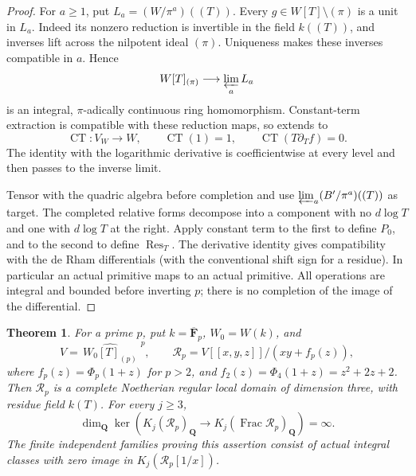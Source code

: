 \documentclass[11pt,a4paper]{amsart}
\numberwithin{equation}{section}
\newtheorem{theorem}{Theorem}[section]
\theoremstyle{definition}
\theoremstyle{remark}
\newcommand{\Q}{\mathbf Q}
\newcommand{\F}{\mathbf F}
\newcommand{\Frac}{\operatorname{Frac}}
\begin{document}
\begin{proof}
For $a\geq1$, put $L_a=(W/\pi^a)((T))$.
Every $g\in W[T]\setminus(\pi)$ is a unit in $L_a$.
Indeed its nonzero reduction is invertible in the field
$k((T))$, and inverses lift across the nilpotent ideal $(\pi)$.
Uniqueness makes these inverses compatible in $a$. Hence
\[
 W[T]_{(\pi)}\longrightarrow\varprojlim_a L_a
\]
is an integral, $\pi$-adically continuous ring homomorphism.
Constant-term extraction is compatible with these reduction maps,
so extends to
\[
 \operatorname{CT}:V_W\longrightarrow W,\qquad
 \operatorname{CT}(1)=1,\qquad
 \operatorname{CT}(T\partial_T f)=0.
\]
The identity with the logarithmic derivative is coefficientwise
at every level and then passes to the inverse limit.

Tensor with the quadric algebra before completion and use
$\varprojlim_a(B'/\pi^a)((T))$ as target.  The completed relative
forms decompose into a component with no $d\log T$ and one
with $d\log T$ at the right. Apply constant term to the first
to define $P_0$, and to the second to define
$\operatorname{Res}_T$.
The derivative identity gives compatibility with the de Rham
differentials (with the conventional shift sign for a residue).
In particular an actual primitive maps to an actual primitive.
All operations are integral and bounded before inverting $p$;
there is no completion of the image of the differential.
\end{proof}

\begin{theorem}
\label{d3:thm:completedfixedalldegree}
For a prime $p$, put $k=\overline{\F}_p$, $W_0=W(k)$, and
\[
 V=\widehat{\,W_0[T]_{(p)}\,}^{\,p},\qquad
 \mathcal R_p=V[[x,y,z]]/(xy+f_p(z)),
\]
where $f_p(z)=\Phi_p(1+z)$ for $p>2$, and
$f_2(z)=\Phi_4(1+z)=z^2+2z+2$.
Then $\mathcal R_p$ is a complete Noetherian regular local
domain of dimension three, with residue field $k(T)$.
For every $j\geq3$,
\[
 \dim_{\Q}\ker\left(K_j(\mathcal R_p)_{\Q}
          \longrightarrow K_j(\Frac\mathcal R_p)_{\Q}\right)
 =\infty.
\]
The finite independent families proving this assertion consist
of actual integral classes with zero image in
$K_j(\mathcal R_p[1/x])$.
\end{theorem}
\end{document}
